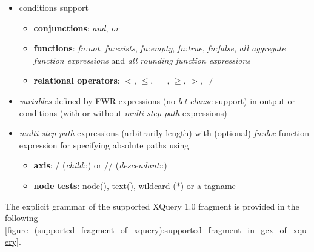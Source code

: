 \begin{itemize}
  \item[\textbullet] conditions support
  \begin{itemize}
    \setlength{\itemsep}{0pt}
    \item[\textbullet] \textbf{conjunctions}: \emph{and}, \emph{or}
    \item[\textbullet] \textbf{functions}: \emph{fn:not}, \emph{fn:exists}, \emph{fn:empty}, \emph{fn:true}, \emph{fn:false}, \emph{all aggregate function expressions} and \emph{all rounding function expressions}
    \item[\textbullet] \textbf{relational operators}: $<$, $\leq$, $=$, $\geq$, $>$, $\neq$
  \end{itemize}
  \item[\textbullet] \emph{variables} defined by FWR expressions (no \emph{let-clause} support) in output or conditions (with or without \emph{multi-step path} expressions)
  \item[\textbullet] \emph{multi-step path} expressions (arbitrarily length) with (optional) \emph{fn:doc} function expression for specifying absolute paths using
  \begin{itemize}
    \setlength{\itemsep}{0pt}
    \item[\textbullet] \textbf{axis}: / (\emph{child}::) or // (\emph{descendant}::)
    \item[\textbullet] \textbf{node tests}: node(), text(), wildcard ($\ast$) or a tagname
  \end{itemize}
\end{itemize}

\noindent The explicit grammar of the supported XQuery 1.0 fragment is provided in the following \autoref{figure_(supported_fragment_of_xquery):supported_fragment_in_gcx_of_xquery}.


